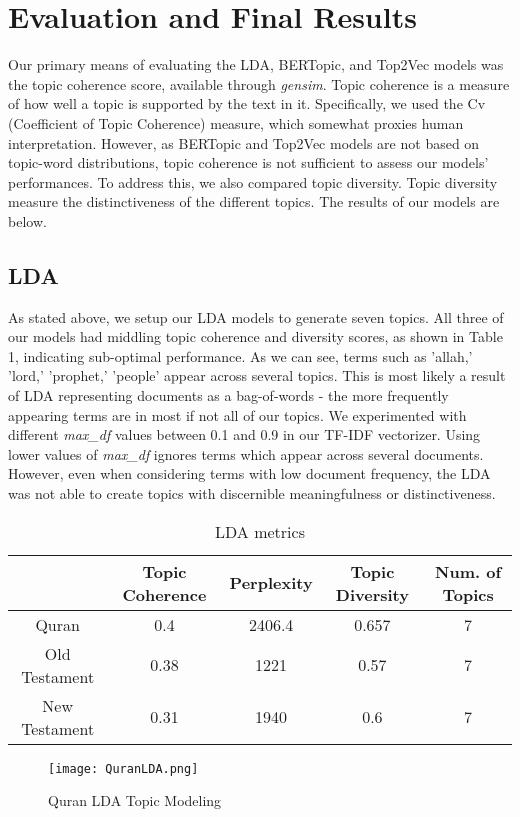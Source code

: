 \documentclass{article}
\begin{document}
\section{Evaluation and Final Results}
    Our primary means of evaluating the LDA, BERTopic, and Top2Vec models was the topic coherence score, available through \textit{gensim}. Topic coherence is a measure of how well a topic is supported by the text in it. Specifically, we used the Cv (Coefficient of Topic Coherence) measure, which somewhat proxies human interpretation. However, as BERTopic and Top2Vec models are not based on topic-word distributions, topic coherence is not sufficient to assess our models' performances. To address this, we also compared topic diversity. Topic diversity measure the distinctiveness of the different topics. The results of our models are below. 
    \subsection{LDA}
    As stated above, we setup our LDA models to generate seven topics. All three of our models had middling topic coherence and diversity scores, as shown in Table 1, indicating sub-optimal performance. As we can see, terms such as 'allah,' 'lord,' 'prophet,' 'people' appear across several topics. This is most likely a result of LDA representing documents as a bag-of-words - the more frequently appearing terms are in most if not all of our topics. We experimented with different \textit{max\_df} values between 0.1 and 0.9 in our TF-IDF vectorizer. Using lower values of \textit{max\_df} ignores terms which appear across several documents. However, even when considering terms with low document frequency, the LDA was not able to create topics with discernible meaningfulness or distinctiveness.     
    \begin{table}[H]
        \centering
        \begin{tabular}{|c|c|c|c|c|}
            \hline
             & Topic Coherence & Perplexity & Topic Diversity & Num. of Topics \\
            \hline
            Quran & 0.4 & 2406.4 & 0.657 &7\\
            \hline 
            Old Testament & 0.38 & 1221 &0.57&7\\
            \hline
            New Testament & 0.31 & 1940&0.6&7\\
            \hline 
        \end{tabular}
        \caption{LDA metrics}
        \label{tab:my_label}
    \end{table}
    \begin{figure}[H]
        \centering
        \texttt{[image: QuranLDA.png]}
        \caption{Quran LDA Topic Modeling}
        \label{fig:enter-label}
    \end{figure}
    
\end{document}
